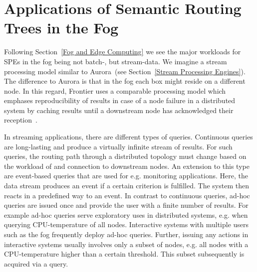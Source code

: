 \section{Applications of Semantic Routing Trees in the Fog}\label{Applications of Semantic Routing Trees in the Fog}
  Following Section~\ref{Fog and Edge Computing} we see the major workloads for SPEs in the fog being not batch-, but stream-data. We imagine a stream processing model similar to Aurora~\cite{abadi_aurora_2003}(see Section~\ref{Stream Processing Engines}). The difference to Aurora is that in the fog each box might reside on a different node. In this regard, Frontier uses a comparable processing model which emphases reproducibility of results in case of a node failure in a distributed system by caching results until a downstream node has acknowledged their reception~\cite{okeeffe_frontier:_2018}.

  In streaming applications, there are different types of queries. Continuous queries are long-lasting and produce a virtually infinite stream of results. For such queries, the routing path through a distributed topology must change based on the workload of and connection to downstream nodes. An extension to this type are event-based queries that are used for e.g. monitoring applications. Here, the data stream produces an event if a certain criterion is fulfilled. The system then reacts in a predefined way to an event. In contrast to continuous queries, ad-hoc queries are issued once and provide the user with a finite number of results. For example ad-hoc queries serve exploratory uses in distributed systems, e.g. when querying CPU-temperature of all nodes. Interactive systems with multiple users such as the fog frequently deploy ad-hoc queries. Further, issuing any actions in interactive systems usually involves only a subset of nodes, e.g. all nodes with a CPU-temperature higher than a certain threshold. This subset subsequently is acquired via a query.

